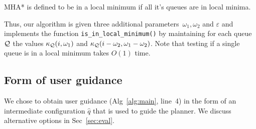 \documentclass[conference]{IEEEtran}
\begin{document}
\begin{definition}
MHA* is defined to be in a local minimum if 
all it's queues are in local minima.
\end{definition}

Thus, our algorithm is given three additional parameters~$\omega_1, \omega_2$ and $\varepsilon$ 
and implements the function \texttt{is\_in\_local\_minimum()} by maintaining for each queue~$\mathcal{Q}$ the values 
$\kappa_{\mathcal{Q}}(i, \omega_1)$ and $\kappa_{\mathcal{Q}}(i - \omega_2, \omega_1 - \omega_2)$.
Note that testing if a single queue is in a local minimum takes $O(1)$ time.




%

%
%
%
%

\subsection{Form of user guidance}
\label{sec:q2}
We chose to obtain user guidance 
(Alg~\ref{alg:main}, line~4)
in the form of an intermediate configuration $\hat{q}$ that is used to guide the planner. We discuss alternative options in Sec~\ref{sec:eval}.
\end{document}
